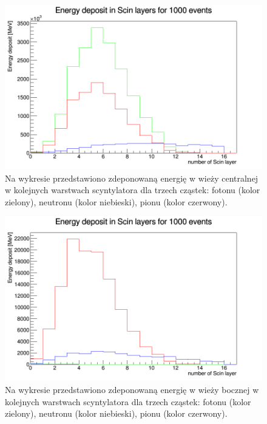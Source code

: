\documentclass[11pt]{article}
\begin{document}
\begin{figure}
\begin{center}
\includegraphics[scale=0.5]{cmp.png}
\caption{Na wykresie przedstawiono zdeponowaną energię w wieży centralnej w 
			kolejnych warstwach scyntylatora dla trzech cząstek: fotonu (kolor zielony), 
			neutronu (kolor niebieski), pionu (kolor czerwony).}\label{w1}
\end{center}
\end{figure}
\begin{figure}
\begin{center}
\includegraphics[scale=0.5]{scp.png}
\caption{Na wykresie przedstawiono zdeponowaną energię w wieży bocznej w 
			kolejnych warstwach scyntylatora dla trzech cząstek: fotonu (kolor zielony), 
			neutronu (kolor niebieski), pionu (kolor czerwony).}\label{w2}
\end{center}
\end{figure}
\end{document}
